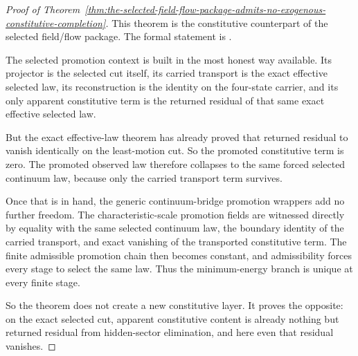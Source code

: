 \begin{proof}[Proof of Theorem~\ref{thm:the-selected-field-flow-package-admits-no-exogenous-constitutive-completion}]
\label{proof:thm:the-selected-field-flow-package-admits-no-exogenous-constitutive-completion}
This theorem is the constitutive counterpart of the selected field/flow
package. The formal statement is
.

The selected promotion context is built in the most honest way available. Its
projector is the selected cut itself, its carried transport is the exact
effective selected law, its reconstruction is the identity on the four-state
carrier, and its only apparent constitutive term is the returned residual of
that same exact effective selected law.

But the exact effective-law theorem has already proved that returned residual
to vanish identically on the least-motion cut. So the promoted constitutive
term is zero. The promoted observed law therefore collapses to the same forced
selected continuum law, because only the carried transport term survives.

Once that is in hand, the generic continuum-bridge promotion wrappers add no further
freedom. The characteristic-scale promotion fields are witnessed directly by
equality with the same selected continuum law, the boundary identity of the
carried transport, and exact vanishing of the transported constitutive term.
The finite admissible promotion chain then becomes constant, and admissibility
forces every stage to select the same law. Thus the minimum-energy branch is
unique at every finite stage.

So the theorem does not create a new constitutive layer. It proves the
opposite: on the exact selected cut, apparent constitutive content is already
nothing but returned residual from hidden-sector elimination, and here even
that residual vanishes.
\end{proof}

